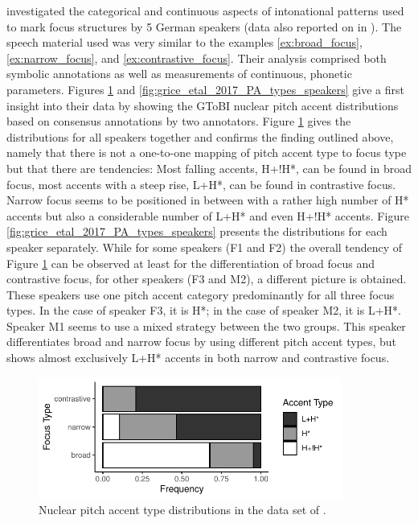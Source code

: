 \citet{Griceetal2017} investigated the categorical and continuous aspects of intonational patterns used to mark focus structures by 5 German speakers (data also reported on in \citealp{MückeGrice2014}). The speech material used was very similar to the examples \ref{ex:broad_focus}, \ref{ex:narrow_focus}, and \ref{ex:contrastive_focus}. Their analysis comprised both symbolic annotations as well as measurements of continuous, phonetic parameters. Figures \ref{fig:grice_etal_2017_PA_types} and \ref{fig:grice_etal_2017_PA_types_speakers} give a first insight into their data by showing the GToBI nuclear pitch accent distributions based on consensus annotations by two annotators. Figure \ref{fig:grice_etal_2017_PA_types} gives the distributions for all speakers together and confirms the finding outlined above, namely that there is not a one-to-one mapping of pitch accent type to focus type but that there are tendencies: Most falling accents, H+!H*, can be found in broad focus, most accents with a steep rise, L+H*, can be found in contrastive focus. Narrow focus seems to be positioned in between with a rather high number of H* accents but also a considerable number of L+H* and even H+!H* accents. Figure \ref{fig:grice_etal_2017_PA_types_speakers} presents the distributions for each speaker separately. While for some speakers (F1 and F2) the overall tendency of Figure \ref{fig:grice_etal_2017_PA_types} can be observed at least for the differentiation of broad focus and contrastive focus, for other speakers (F3 and M2), a different picture is obtained. These speakers use one pitch accent category predominantly for all three focus types. In the case of speaker F3, it is H*; in the case of speaker M2, it is L+H*. Speaker M1 seems to use a mixed strategy between the two groups. This speaker differentiates broad and\largerpage{} narrow focus by using different pitch accent types, but shows almost exclusively L+H* accents in both narrow and contrastive focus.

\begin{figure}[p]
\includegraphics[width=10cm]{figures/ch4/Grice_etal_PA_Types.pdf}
\caption{Nuclear pitch accent type distributions in the data set of \citet{Griceetal2017}.}
\label{fig:grice_etal_2017_PA_types}
\end{figure}

